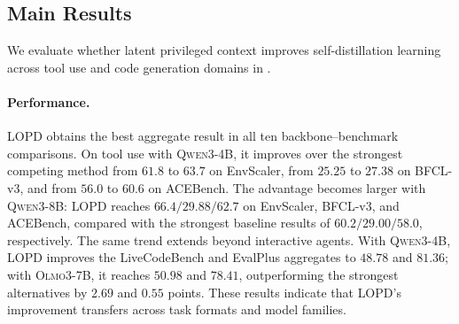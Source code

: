 \documentclass{article} %
\newcommand{\llmname}[1]{\textsc{#1}}
\newcommand{\ourmethod}{{\textsc{LOPD}}\xspace}
\begin{document}
\vspace{-0.4em}
\subsection{Main Results}
\vspace{-0.6em}
We evaluate whether latent privileged context improves self-distillation learning across tool use and code generation domains in .

\vspace{-0.7em}
\paragraph{Performance.}
\ourmethod obtains the best aggregate result in all ten backbone--benchmark comparisons. On tool use with \llmname{Qwen3-4B}, it improves over the strongest competing method from $61.8$ to $63.7$ on EnvScaler, from $25.25$ to $27.38$ on BFCL-v3, and from $56.0$ to $60.6$ on ACEBench. The advantage becomes larger with \llmname{Qwen3-8B}: \ourmethod reaches $66.4/29.88/62.7$ on EnvScaler, BFCL-v3, and ACEBench, compared with the strongest baseline results of $60.2/29.00/58.0$, respectively. The same trend extends beyond interactive agents. With \llmname{Qwen3-4B}, \ourmethod improves the LiveCodeBench and EvalPlus aggregates to $48.78$ and $81.36$; with \llmname{Olmo3-7B}, it reaches $50.98$ and $78.41$, outperforming the strongest alternatives by $2.69$ and $0.55$ points. These results indicate that \ourmethod's improvement transfers across task formats and model families.

\vspace{-0.7em}
\end{document}

